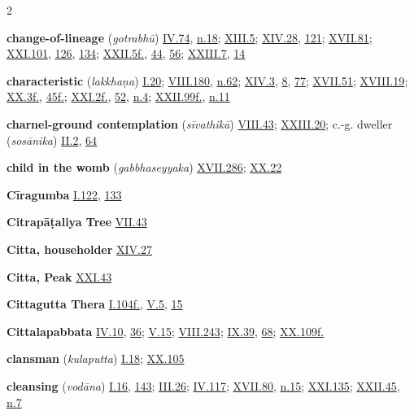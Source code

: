 \begin{multicols}{2}
\begin{vismHanging}
\par\textbf{change-of-lineage} (\emph{gotrabhū}) \hyperlink{IV.74}{IV.74}{}, \hyperlink{IV.n18}{n.18}{}; \hyperlink{XIII.5}{XIII.5}{}; \hyperlink{XIV.28}{XIV.28}{}, \hyperlink{XIV.121}{121}{}; \hyperlink{XVII.81}{XVII.81}{}; \hyperlink{XXI.101}{XXI.101}{}, \hyperlink{XXI.126}{126}{}, \hyperlink{XXI.134}{134}{}; \hyperlink{XXII.5}{XXII.5f.}{}, \hyperlink{XXII.44}{44}{}, \hyperlink{XXII.56}{56}{}; \hyperlink{XXIII.7}{XXIII.7}{}, \hyperlink{XXIII.14}{14}{}
\par\textbf{characteristic} (\emph{lakkhaṇa}) \hyperlink{I.20}{I.20}{}; \hyperlink{VIII.180}{VIII.180}{}, \hyperlink{VIII.n62}{n.62}{}; \hyperlink{XIV.3}{XIV.3}{}, \hyperlink{XIV.8}{8}{}, \hyperlink{XIV.77}{77}{}; \hyperlink{XVII.51}{XVII.51}{}; \hyperlink{XVIII.19}{XVIII.19}{}; \hyperlink{XX.3}{XX.3f.}{}, \hyperlink{XX.45}{45f.}{}; \hyperlink{XXI.2}{XXI.2f.}{}, \hyperlink{XXI.52}{52}{}, \hyperlink{XXI.n4}{n.4}{}; \hyperlink{XXII.99}{XXII.99f.}{}, \hyperlink{XXII.n11}{n.11}{}
\par\textbf{charnel-ground contemplation} (\emph{sīvathikā}) \hyperlink{VIII.43}{VIII.43}{}; \hyperlink{XXIII.20}{XXIII.20}{}; c.-g. dweller (\emph{sosānika}) \hyperlink{II.2}{II.2}{}, \hyperlink{II.64}{64}{}
\par\textbf{child in the womb} (\emph{gabbhaseyyaka}) \hyperlink{XVII.286}{XVII.286}{}; \hyperlink{XX.22}{XX.22}{}
\par\textbf{Cīragumba} \hyperlink{I.122}{I.122}{}, \hyperlink{I.133}{133}{}
\par\textbf{Citrapāṭaliya Tree} \hyperlink{VII.43}{VII.43}{}
\par\textbf{Citta, householder} \hyperlink{XIV.27}{XIV.27}{}
\par\textbf{Citta, Peak} \hyperlink{XXI.43}{XXI.43}{}
\par\textbf{Cittagutta Thera} \hyperlink{I.104}{I.104f.}{}, \hyperlink{V.5}{V.5}{}, \hyperlink{V.15}{15}{}
\par\textbf{Cittalapabbata} \hyperlink{IV.10}{IV.10}{}, \hyperlink{IV.36}{36}{}; \hyperlink{V.15}{V.15}{}; \hyperlink{VIII.243}{VIII.243}{}; \hyperlink{IX.39}{IX.39}{}, \hyperlink{IX.68}{68}{}; \hyperlink{XX.109}{XX.109f.}{}
\par\textbf{clansman} (\emph{kulaputta}) \hyperlink{I.18}{I.18}{}; \hyperlink{XX.105}{XX.105}{}
\par\textbf{cleansing} (\emph{vodāna}) \hyperlink{I.16}{I.16}{}, \hyperlink{I.143}{143}{}; \hyperlink{III.26}{III.26}{}; \hyperlink{IV.117}{IV.117}{}; \hyperlink{XVII.80}{XVII.80}{}, \hyperlink{XVII.n15}{n.15}{}; \hyperlink{XXI.135}{XXI.135}{}; \hyperlink{XXII.45}{XXII.45}{}, \hyperlink{XXII.n7}{n.7}{}

\end{vismHanging}
\end{multicols}
